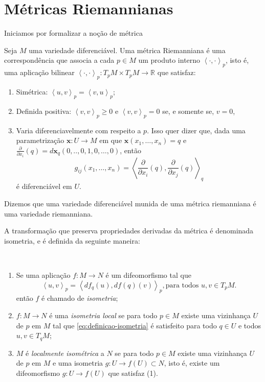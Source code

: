 \section{Métricas Riemannianas}
\label{sec:metricas-riemannianas}
Iniciamos por formalizar a noção de métrica
\begin{definition}
	\label{def:metrica-riemanniana}
	Seja $M$ uma variedade diferenciável. Uma métrica Riemanniana é uma correspondência que associa a cada $p \in M$ um produto interno $\left<\cdot, \cdot\right>_{p}$, isto é, uma aplicação bilinear $\left<\cdot,\cdot\right>_{p}:T_{p}M\times T_{p}M\to \mathbb{R}$ que satisfaz:
	\begin{enumerate}[label=(\roman*)]
		\item Simétrica: $\left<u, v\right>_{p}= \left<v,u\right>_{p}$;
		\item Definida positiva: $\left<v, v\right>_{p} \geq 0$ e $\left<v,v\right>_{p}=0$ se, e somente se, $v=0$,
		\item Varia diferenciavelmente com respeito a $p$. Isso quer dizer que, dada uma parametrização $\mathbf{x}:U\to M$ em que $\mathbf{x}(x_{1}, \dots, x_{n})=q$ e $\frac{\partial}{\partial x_{i}}(q)=d\mathbf{x}_{q}(0, .., 0, 1, 0, \dots, 0)$, então
		      \begin{equation*}
			      g_{ij}(x_{1}, \dots, x_{n})=\left<\frac{\partial}{\partial x_{i}}(q),\frac{\partial}{\partial x_{j}}(q)\right>_{q}
		      \end{equation*}
		      é diferenciável em $U$.
	\end{enumerate}
\end{definition}
Dizemos que uma variedade diferenciável munida de uma métrica riemanniana é uma variedade riemanniana.

A transformação que preserva propriedades derivadas da métrica é denominada isometria, e é definida da seguinte maneira:

\begin{definition}
	$ $
	\begin{enumerate}[label=(\roman*)]
		\item Se uma aplicação $f:M\to N$ é um difeomorfismo tal que
		      \begin{equation}
			      \label{eq:definicao-isometria}
			      \left< u, v \right>_{p}=\left< df_{q}(u), df(q)(v) \right>_{p}, \text{para todos } u,v \in T_{p}M.
		      \end{equation}
		      então $f$ é chamado de \emph{isometria};
		\item $f:M\to N$ é uma \emph{isometria local} se para todo $p \in M$ existe uma vizinhança $U$ de $p$ em $M$ tal que \eqref{eq:definicao-isometria} é satisfeito para todo $q \in U$ e todos $u,v \in T_{q}M$;
		\item $M$ é \emph{localmente isométrica} a $N$ se para todo $p \in M$ existe uma vizinhança $U$ de $p$ em $M$ e uma isometria $g:U\to f(U) \subset N$, isto é, existe um difeomorfismo $g:U\to f(U)$ que satisfaz (1).
	\end{enumerate}
\end{definition}


